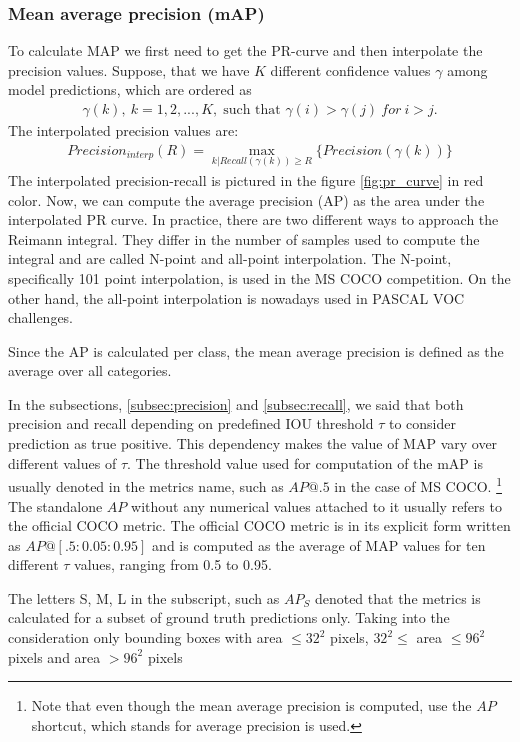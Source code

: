 \subsubsection{Mean average precision (mAP)}
To calculate MAP we first need to get the PR-curve and then interpolate the precision values. Suppose, that we have $K$ different confidence values $\gamma$ among model predictions, which are ordered as
\begin{align}
    \gamma(k),\: k = 1,2,...,K,  \; \text{such that } \gamma(i) > \gamma(j) \: for \: i > j.
\end{align}
The interpolated precision values are:
\begin{align}
    Precision_{interp}(R) = \max_{k|Recall(\gamma(k)) \geq R} \{  Precision(\gamma(k)) \}
\end{align}
The interpolated precision-recall is pictured in the figure \ref{fig:pr_curve} in red color. Now, we can compute the average precision (AP) as the area under the interpolated PR curve.
In practice, there are two different ways to approach the Reimann integral. They differ in the number of samples used to compute the integral and are called N-point and all-point interpolation. The N-point, specifically 101 point interpolation, is used in the MS COCO competition. On the other hand, the all-point interpolation is nowadays used in PASCAL VOC challenges.

Since the AP is calculated per class, the mean average precision is defined as the average over all categories.

In the subsections, \ref{subsec:precision} and \ref{subsec:recall}, we said that both precision and recall depending on predefined IOU threshold $\tau$ to consider prediction as true positive. This dependency makes the value of MAP vary over different values of $\tau$. The threshold value used for computation of the mAP is usually denoted in the metrics name, such as $AP@.5$ in the case of MS COCO. \footnote{Note that even though the mean average precision is computed, use the $AP$ shortcut, which stands for average precision is used.} The standalone $AP$ without any numerical values attached to it usually refers to the official COCO metric. The official COCO metric is in its explicit form written as $AP@[.5:0.05:0.95]$ and is computed as the average of MAP values for ten different $\tau$ values, ranging from 0.5 to 0.95.

The letters S, M, L in the subscript, such as $AP_S$ denoted that the metrics is calculated for a subset of ground truth predictions only. Taking into the consideration only bounding boxes with area $\leq 32^2$ pixels, $32^2 \le $ area $ \leq 96^2$ pixels and area $> 96^2$ pixels

